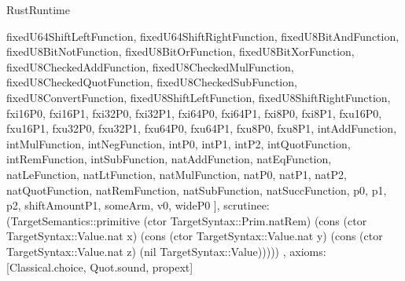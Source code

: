 \begin{lexlean}{RustRuntime}
\begin{semanticmodule}
{{      fixedU64ShiftLeftFunction,
      fixedU64ShiftRightFunction,
      fixedU8BitAndFunction,
      fixedU8BitNotFunction,
      fixedU8BitOrFunction,
      fixedU8BitXorFunction,
      fixedU8CheckedAddFunction,
      fixedU8CheckedMulFunction,
      fixedU8CheckedQuotFunction,
      fixedU8CheckedSubFunction,
      fixedU8ConvertFunction,
      fixedU8ShiftLeftFunction,
      fixedU8ShiftRightFunction,
      fxi16P0,
      fxi16P1,
      fxi32P0,
      fxi32P1,
      fxi64P0,
      fxi64P1,
      fxi8P0,
      fxi8P1,
      fxu16P0,
      fxu16P1,
      fxu32P0,
      fxu32P1,
      fxu64P0,
      fxu64P1,
      fxu8P0,
      fxu8P1,
      intAddFunction,
      intMulFunction,
      intNegFunction,
      intP0,
      intP1,
      intP2,
      intQuotFunction,
      intRemFunction,
      intSubFunction,
      natAddFunction,
      natEqFunction,
      natLeFunction,
      natLtFunction,
      natMulFunction,
      natP0,
      natP1,
      natP2,
      natQuotFunction,
      natRemFunction,
      natSubFunction,
      natSuccFunction,
      p0,
      p1,
      p2,
      shiftAmountP1,
      someArm,
      v0,
      wideP0
    ],
    scrutinee: (TargetSemantics::primitive (ctor TargetSyntax::Prim.natRem) (cons (ctor TargetSyntax::Value.nat x) (cons (ctor TargetSyntax::Value.nat y) (cons (ctor TargetSyntax::Value.nat z) (nil TargetSyntax::Value)))))
  },
  axioms: [Classical.choice, Quot.sound, propext]
}


\end{semanticmodule}
\end{lexlean}
